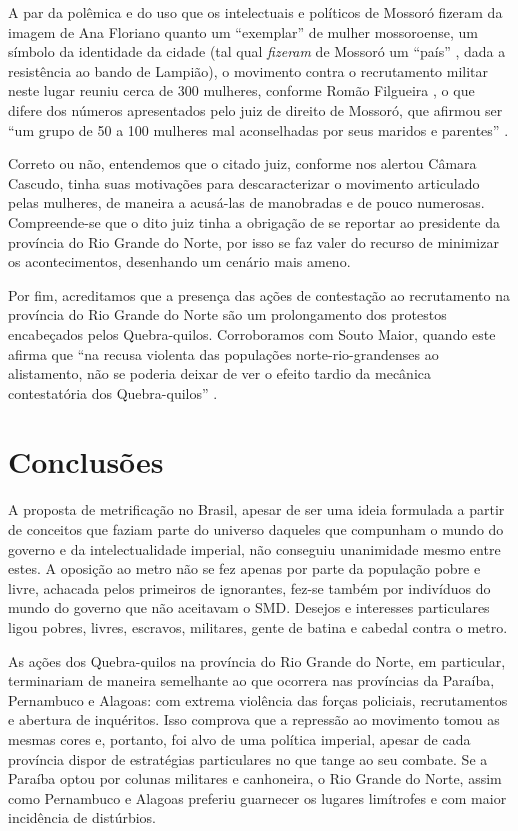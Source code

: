 \begin{refsection}
A par da polêmica e do uso que os intelectuais e políticos de Mossoró fizeram da imagem de Ana Floriano quanto um “exemplar” de mulher mossoroense, um símbolo da identidade da cidade (tal qual \textit{fizeram} de Mossoró um “país” \cite{Carvalho2012}, dada a resistência ao bando de Lampião), o movimento contra o recrutamento militar neste lugar reuniu cerca de 300 mulheres, conforme Romão Filgueira \cite{Rosado1981}, o que difere dos números apresentados pelo juiz de direito de Mossoró, que afirmou ser “um grupo de 50 a 100 mulheres mal aconselhadas por seus maridos e parentes” \cite{Rosado1981}.

Correto ou não, entendemos que o citado juiz, conforme nos alertou Câmara Cascudo, tinha suas motivações para descaracterizar o movimento articulado pelas mulheres, de maneira a acusá-las de manobradas e de pouco numerosas. Compreende-se que o dito juiz tinha a obrigação de se reportar ao presidente da província do Rio Grande do Norte, por isso se faz valer do recurso de minimizar os acontecimentos, desenhando um cenário mais ameno. 

Por fim, acreditamos que a presença das ações de contestação ao recrutamento na província do Rio Grande do Norte são um prolongamento dos protestos encabeçados pelos Quebra-quilos. Corroboramos com Souto Maior, quando este afirma que “na recusa violenta das populações norte-rio-grandenses ao alistamento, não se poderia deixar de ver o efeito tardio da mecânica contestatória dos Quebra-quilos” \cite[p.~192]{Maior1978}.

\section{Conclusões}

A proposta de metrificação no Brasil, apesar de ser uma ideia formulada a partir de conceitos que faziam parte do universo daqueles que compunham o mundo do governo e da intelectualidade imperial, não conseguiu unanimidade mesmo entre estes. A oposição ao metro não se fez apenas por parte da população pobre e livre, achacada pelos primeiros de ignorantes, fez-se também por indivíduos do mundo do governo que não aceitavam o SMD. Desejos e interesses particulares ligou pobres, livres, escravos, militares, gente de batina e cabedal contra o metro.  

As ações dos Quebra-quilos na província do Rio Grande do Norte, em particular, terminariam de maneira semelhante ao que ocorrera nas províncias da Paraíba, Pernambuco e Alagoas: com extrema violência das forças policiais, recrutamentos e abertura de inquéritos. Isso comprova que a repressão ao movimento tomou as mesmas cores e, portanto, foi alvo de uma política imperial, apesar de cada província dispor de estratégias particulares no que tange ao seu combate. Se a Paraíba optou por colunas militares e canhoneira, o Rio Grande do Norte, assim como Pernambuco e Alagoas preferiu guarnecer os lugares limítrofes e com maior incidência de distúrbios. 


\end{refsection}
